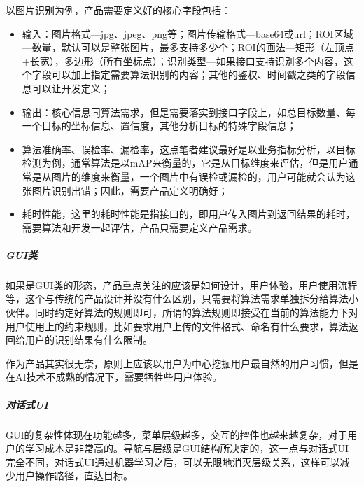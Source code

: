 \documentclass[letterpaper,10pt,english]{sphinxmanual}
\begin{document}
以图片识别为例，产品需要定义好的核心字段包括：
\begin{itemize}
\item {} 
输入：图片格式—jpg、jpeg、png等；图片传输格式—base64或url；ROI区域—数量，默认可以是整张图片，最多支持多少个；ROI的画法—矩形（左顶点+长宽），多边形（所有坐标点）；识别类型—如果接口支持识别多个内容，这个字段可以加上指定需要算法识别的内容；其他的鉴权、时间戳之类的字段信息可以让开发定义；

\item {} 
输出：核心信息同算法需求，但是需要落实到接口字段上，如总目标数量、每一个目标的坐标信息、置信度，其他分析目标的特殊字段信息；

\item {} 
算法准确率、误检率、漏检率，这点笔者建议最好是以业务指标分析，以目标检测为例，通常算法是以mAP来衡量的，它是从目标维度来评估，但是用户通常是从图片的维度来衡量，一个图片中有误检或漏检的，用户可能就会认为这张图片识别出错；因此，需要产品定义明确好；

\item {} 
耗时性能，这里的耗时性能是指接口的，即用户传入图片到返回结果的耗时，需要算法和开发一起评估，产品只需要定义产品需求。

\end{itemize}


\subparagraph{GUI类}
\label{\detokenize{chapter_introduction/AI_Product:gui}}
如果是GUI类的形态，产品重点关注的应该是如何设计，用户体验，用户使用流程等，这个与传统的产品设计并没有什么区别，只需要将算法需求单独拆分给算法小伙伴。同时约定好算法的规则即可，所谓的算法规则即接受在当前的算法能力下对用户使用上的约束规则，比如要求用户上传的文件格式、命名有什么要求，算法返回给用户的识别结果有什么限制。

作为产品其实很无奈，原则上应该以用户为中心挖掘用户最自然的用户习惯，但是在AI技术不成熟的情况下，需要牺牲些用户体验。


\subparagraph{对话式UI}
\label{\detokenize{chapter_introduction/AI_Product:ui}}
GUI的复杂性体现在功能越多，菜单层级越多，交互的控件也越来越复杂，对于用户的学习成本是非常高的。导航与层级是GUI结构所决定的，这一点与对话式UI完全不同，对话式UI通过机器学习之后，可以无限地消灭层级关系，这样可以减少用户操作路径，直达目标。%
\begin{footnote}[242]\sphinxAtStartFootnote
{}
%
\end{footnote}
\end{document}
